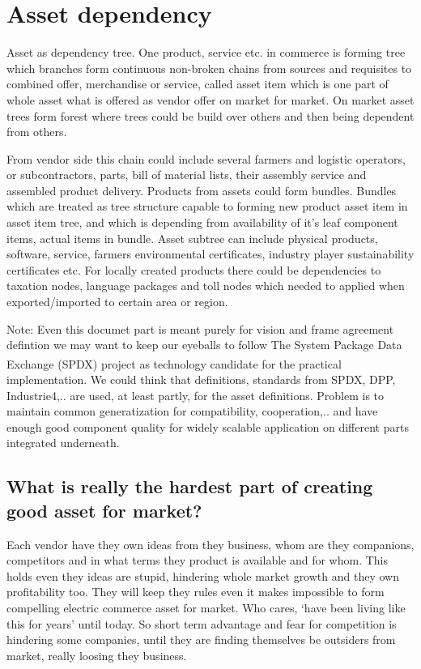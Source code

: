 \section{Asset dependency}\label{dependency}
Asset as dependency tree. One product, service etc. in commerce is forming
tree which branches form continuous non-broken chains from sources and
requisites to combined offer, merchandise or service, called asset item which
is one part of whole asset what is offered as vendor offer on market for
market. On market asset trees form forest where trees could be build over
others and then being dependent from others.

From vendor side this chain could include several farmers and logistic
operators, or subcontractors, parts, bill of material lists, their assembly
service and assembled product delivery. Products from assets could form
bundles. Bundles which are treated as tree structure capable to forming new
product asset item in asset item tree, and which is depending from
availability of it's leaf component items, actual items in bundle. Asset
subtree can include physical products, software, service, farmers
environmental certificates, industry player sustainability certificates etc.
For locally created products there could be dependencies to taxation nodes,
language packages and toll nodes which needed to applied when
exported/imported to certain area or region.

Note: Even this documet part is meant purely for vision and frame agreement
defintion we may want to keep our eyeballs to follow The System Package Data
Exchange\textsuperscript{\texttrademark}
(SPDX\textregistered)\allowbreak\cite{SPDX} project as technology candidate
for the practical implementation. We could think that definitions, standards
from SPDX\allowbreak\cite{SPDX}, DPP\allowbreak\cite{DPP},
Industrie4\allowbreak\cite{Industrie4x},.. are used, at least partly,
for the asset definitions. Problem is to maintain common generatization for
compatibility, cooperation,.. and have enough good component quality for
widely scalable application on different parts integrated underneath.

\subsection{What is really the hardest part of creating good asset for market?}
\label{selfishness_obstacle}
Each vendor have they own ideas from they business, whom are they companions,
competitors and in what terms they product is available and for whom. This
holds even they ideas are stupid, hindering whole market growth and they own
profitability too. They will keep they rules even it makes impossible to form
compelling electric commerce asset for market. Who cares, `have been living
like this for years' until today. So short term advantage and fear for
competition is hindering some companies, until they are finding themselves be
outsiders from market, really loosing they business.

